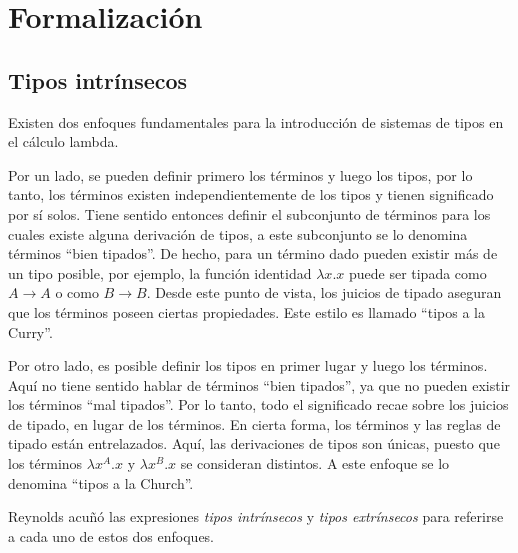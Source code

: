 \newcommand{\const}[1]{\AgdaInductiveConstructor{#1}}
\newcommand{\bound}[1]{\AgdaBound{#1}}
\newcommand{\func}[1]{\AgdaFunction{#1}}
\newcommand{\type}[1]{\AgdaDatatype{#1}}
\newcommand{\snstar}{\type{SN*} \func{⟦\_⟧} }
\newcommand{\cand}[1]{\func{⟦}#1\func{⟧}}

\newcommand{\parens}[1]{\AgdaSymbol{(}#1\AgdaSymbol{)}}
\newcommand{\subst}[2]{\func{⟪}\AgdaSpace{}#1\AgdaSpace{}\func{⟫}\AgdaSpace{}#2}
\newcommand{\cons}[2]{#1 \func{•} #2}
\newcommand{\ids}{\func{ids}}
\newcommand{\comp}[2]{#1 \func{∘} #2}


\section{Formalización}

\subsection{Tipos intrínsecos}

Existen dos enfoques fundamentales para la introducción de sistemas de tipos en el cálculo lambda.

Por un lado, se pueden definir primero los términos y luego los tipos, por lo tanto, los términos existen independientemente de los tipos y tienen significado por sí solos.
Tiene sentido entonces definir el subconjunto de términos para los cuales existe alguna derivación de tipos, a este subconjunto se lo denomina términos ``bien tipados''.
De hecho, para un término dado pueden existir más de un tipo posible, por ejemplo, la función identidad $\lambda x.x$ puede ser tipada como $A \rightarrow A$ o como $B \rightarrow B$.
Desde este punto de vista, los juicios de tipado aseguran que los términos poseen ciertas propiedades.
Este estilo es llamado ``tipos a la Curry''.

Por otro lado, es posible definir los tipos en primer lugar y luego los términos.
Aquí no tiene sentido hablar de términos ``bien tipados'', ya que no pueden existir los términos ``mal tipados''.
Por lo tanto, todo el significado recae sobre los juicios de tipado, en lugar de los términos.
En cierta forma, los términos y las reglas de tipado están entrelazados.
Aquí, las derivaciones de tipos son únicas, puesto que los términos $\lambda x^A.x$ y $\lambda x^B.x$ se consideran distintos.
A este enfoque se lo denomina ``tipos a la Church''.

Reynolds\cite{reynolds_1998} acuñó las expresiones \textit{tipos intrínsecos} y \textit{tipos extrínsecos} para referirse a cada uno de estos dos enfoques.


